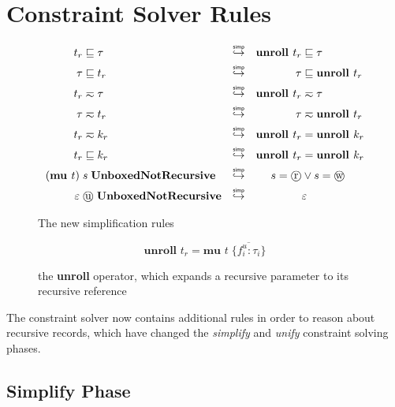 \section{Constraint Solver Rules}

\begin{figure}
    \centering
    \begin{align}
       t_r  &\subtype \tau  & \simp  && \textbf{unroll } t_r  &\subtype  \tau \label{eq:firsteq} \\
       \tau &\subtype t_r   & \simp  && \tau                  &\subtype  \textbf{unroll } t_r \\
       t_r  &\typeeq  \tau  & \simp  && \textbf{unroll } t_r  &\typeeq   \tau \\
       \tau &\typeeq  t_r   & \simp  && \tau                  &\typeeq   \textbf{unroll } t_r \label{eq:lasteq} \\
       t_r  &\typeeq  k_r   & \simp  && \textbf{unroll } t_r  &=         \textbf{unroll } k_r \label{eq:firstrecs} \\
       t_r  &\subtype k_r   & \simp  && \textbf{unroll } t_r  &=         \textbf{unroll } k_r \label{eq:lastrecs} \\
       (\textbf{mu } t)\; &s\; \textbf{UnboxedNotRecursive}   
            & \simp &&  s = \text{\textcircled{r}} &\lor s = \text{\textcircled{w}} \label{eq:firstunbox} \\
       \varepsilon\; &\text{\textcircled{u}}\; \textbf{UnboxedNotRecursive} 
            & \simp &&  &\varepsilon \label{eq:lastunbox}
    \end{align}
    \caption{The new simplification rules}
    \label{fig:simprules}
\end{figure}

\begin{figure}
    \centering
    \[
        \textbf{unroll } t_r = \textbf{mu } t\; \{ \overline{f_i^u : \tau_i} \} 
    \]
    \caption{the \textbf{unroll} operator, which expands a recursive parameter
             to its recursive reference}
    \label{fig:unrolldef}
\end{figure}

The constraint solver now contains additional rules in order to reason about recursive
records, which have changed the \textit{simplify} and \textit{unify}
constraint solving phases.

\subsection{Simplify Phase}

